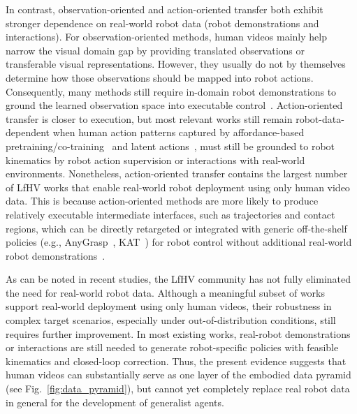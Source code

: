 \documentclass[Afour,sageh,times]{sagej}
\begin{document}
In contrast, observation-oriented and action-oriented transfer both exhibit stronger dependence on real-world robot data (robot demonstrations and interactions). For observation-oriented methods, human videos mainly help narrow the visual domain gap by providing translated observations or transferable visual representations. However, they usually do not by themselves determine how those observations should be mapped into robot actions. Consequently, many methods still require in-domain robot demonstrations to ground the learned observation space into executable control~\citep{li2024ag2manip,li2025h2r,li2025mimicdreamer,lepert2025masquerade,jiang2025rynnvla}. Action-oriented transfer is closer to execution, but most relevant works still remain robot-data-dependent when human action patterns captured by affordance-based pretraining/co-training~\citep{srirama2024hrp,luo2025being,kareer2025egomimic,zhu2026emma} and latent actions~\citep{ye2024latent,chen2024igor,chen2025villa,li2025latbot}, must still be grounded to robot kinematics by robot action supervision or interactions with real-world environments. Nonetheless, action-oriented transfer contains the largest number of LfHV works that enable real-world robot deployment using only human video data. This is because action-oriented methods are more likely to produce relatively executable intermediate interfaces, such as trajectories and contact regions, which can be directly retargeted or integrated with generic off-the-shelf policies (e.g., AnyGrasp~\citep{fang2023anygrasp}, KAT~\citep{di2024keypoint}) for robot control without additional real-world robot demonstrations~\citep{bahl2023affordances,bharadhwaj2024track2act,kuang2024ram,papagiannis2025r,hsu2025spot,zhang2025actron3d}.


As can be noted in recent studies, the LfHV community has not fully eliminated the need for real-world robot data. Although a meaningful subset of works support real-world deployment using only human videos, their robustness in complex target scenarios, especially under out-of-distribution conditions, still requires further improvement. In most existing works, real-robot demonstrations or interactions are still needed to generate robot-specific policies with feasible kinematics and closed-loop correction. Thus, the present evidence suggests that human videos can substantially serve as one layer of the embodied data pyramid (see Fig.~\ref{fig:data_pyramid}), but cannot yet completely replace real robot data in general for the development of generalist agents.
\end{document}
